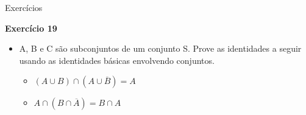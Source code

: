 \documentclass[aspectratio=169]{beamer}
\begin{document}
\begin{frame}{Exercícios}

    \textbf{Exercício 19}


\begin{itemize}
    \item A, B e C são subconjuntos de um conjunto S. Prove as identidades a seguir usando as identidades básicas envolvendo conjuntos.
    \begin{itemize}
        \item $(A \cup B) \cap (A \cup \overline{B}) = A$
        \item $A \cap (B \cap \overline{A}) = B \cap A$
    \end{itemize}
\end{itemize}
\end{frame}
\end{document}
